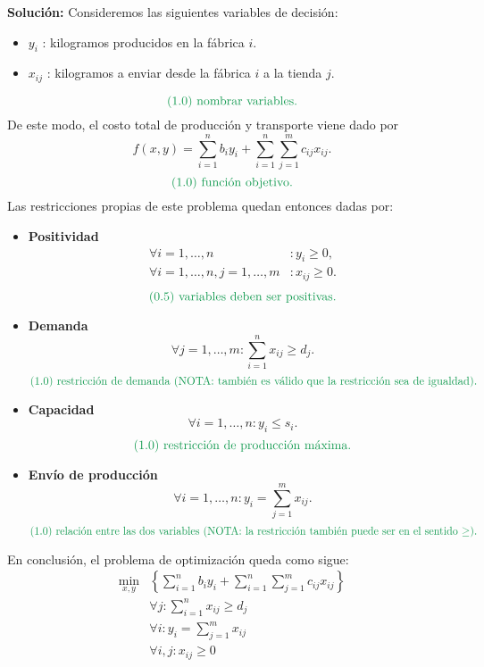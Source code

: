 \documentclass{article}
\begin{document}
\begin{enumerate}
		\textbf{Solución:} Consideremos las siguientes variables de decisión:
		\begin{itemize}
			\item \(y_i\) : kilogramos producidos en la fábrica \(i\).
			\item \(x_{ij}\) : kilogramos a enviar desde la fábrica \(i\) a la tienda \(j\).
		\end{itemize}
		\[
		\text{\textcolor{ForestGreen}{(1.0) nombrar variables.}}
		\]
		De este modo, el costo total de producción y transporte viene dado por
		\[
			f(x, y) = \sum_{i=1}^n b_i y_i + \sum_{i=1}^n \sum_{j=1}^m c_{ij} x_{ij}.
		\]
		\[
			\text{\textcolor{ForestGreen}{(1.0) función objetivo.}}
		\]
		Las restricciones propias de este problema quedan entonces dadas por:
		\begin{itemize}
			\item \textbf{Positividad}
				\begin{align*}
					\forall i = 1, \dots, n &: y_i \geq 0, \\
					\forall i = 1, \dots, n, j = 1, \dots, m &: x_{ij} \geq 0.
				\end{align*}
			\[
				\text{\textcolor{ForestGreen}{(0.5) variables deben ser positivas.}}
			\]
		\item \textbf{Demanda}
			\[
				\forall j = 1, \dots, m : \sum_{i=1}^n x_{ij} \geq d_j.
			\]
			\[
				\text{\textcolor{ForestGreen}{(1.0) restricción de demanda (NOTA: también es válido que la restricción sea de igualdad).}}
			\]
		\item \textbf{Capacidad}
			\[
				\forall i = 1, \dots, n : y_i \leq s_i.
			\]
			\[
				\text{\textcolor{ForestGreen}{(1.0) restricción de producción máxima.}}
			\]
		\item \textbf{Envío de producción}
			\[
				\forall i = 1, \dots, n : y_i = \sum_{j=1}^m x_{ij}.
			\]
			\[
				\text{\textcolor{ForestGreen}{(1.0) relación entre las dos variables (NOTA: la restricción también puede ser en el sentido \(\geq\)).}}
			\]
		\end{itemize}
		En conclusión, el problema de optimización queda como sigue:
		\begin{align*}
			\min_{x,y} & \left\{ \sum_{i=1}^n b_i y_i + \sum_{i=1}^n \sum_{j=1}^m c_{ij}x_{ij}\right\} \\
				   & \forall j : \sum_{i=1}^n x_{ij} \geq d_j \\
				   & \forall i : y_i = \sum_{j=1}^m x_{ij} \\
				   & \forall i, j : x_{ij} \geq 0 \\

\end{align*}
\end{enumerate}
\end{document}
